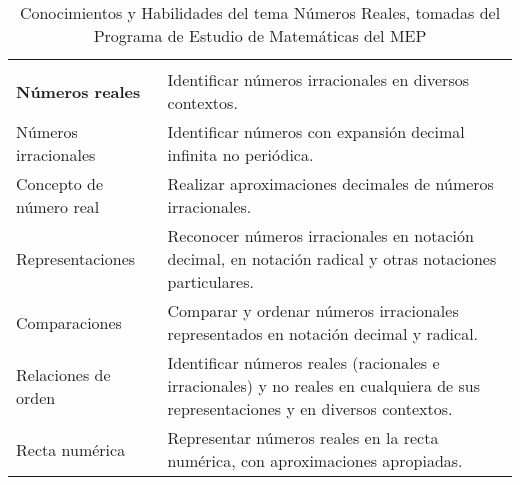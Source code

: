 \begin{table}[htbp]
\centering
\sffamily
\small
{}
\vspace{0.2cm}
 \setlength{\extrarowheight}{.4em}
			\begin{tabularx}{0.99\textwidth}{l*{1}{>{\RaggedRight\arraybackslash}X}}		
\rowcolor{mycolor}\multicolumn{1}{l}{{\color{white}\textbf{Conocimientos}}}&  \multicolumn{1}{l}{{\color{white}\textbf{Habilidades}}}\\
\textbf{Números reales} & Identificar números irracionales en diversos contextos.\\
Números irracionales & Identificar números con expansión decimal infinita no periódica.\\
Concepto de número real & Realizar aproximaciones decimales de números irracionales. \\
Representaciones & Reconocer números irracionales en notación decimal, en notación radical y otras notaciones particulares.\\
Comparaciones & Comparar y ordenar números irracionales representados en notación decimal y radical.\\
Relaciones de orden & Identificar números reales (racionales e irracionales) y no reales en cualquiera de sus representaciones y en diversos contextos.\\
Recta numérica & Representar números reales en la recta numérica, con aproximaciones apropiadas.\\
		\end{tabularx}
		\caption[Tema Números Reales]{Conocimientos y Habilidades del tema Números Reales, tomadas del Programa de Estudio de Matemáticas del MEP} 
		\label{tab:cyhNumerosReales}
\vspace{0.2cm}		
\end{table}